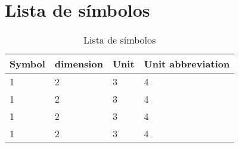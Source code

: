 \section*{Lista de símbolos} \label{section: symbols}

\begin{table}[ht]
\centering
\caption{Lista de símbolos}
\begin{tabular}[t]
{m{}m{}m{}m{}}
\toprule
\textbf{Symbol}&\textbf{dimension}&\textbf{Unit}&\textbf{Unit abbreviation}\\
\midrule
1&2&3&4\\
1&2&3&4\\
1&2&3&4\\
1&2&3&4\\
\bottomrule
\end{tabular}
\end{table}